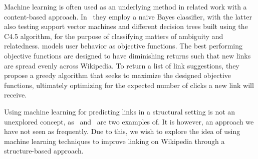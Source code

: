 Machine learning is often used as an underlying method in related work with a content-based approach. In~\cite{mihalcea2007wikify,milne2008learning} they employ a naive Bayes classifier, with the latter also testing support vector machines and different decision trees built using the C4.5 algorithm, for the purpose of classifying matters of ambiguity and relatedness. \cite{hyperlink-structure-using-logs} models user behavior as objective functions. The best performing objective functions are designed to have diminishing returns such that new links are spread evenly across Wikipedia. To return a list of link suggestions, they propose a greedy algorithm that seeks to maximize the designed objective functions, ultimately optimizing for the expected number of clicks a new link will receive.

Using machine learning for predicting links in a structural setting is not an unexplored concept, as~\cite{tang2015line} and~\cite{al2006link} are two examples of. It is however, an approach we have not seen as frequently. Due to this, we wish to explore the idea of using machine learning techniques to improve linking on Wikipedia through a structure-based approach.


